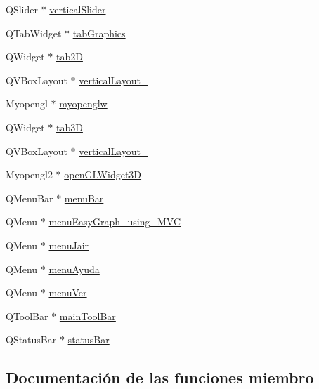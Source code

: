 \begin{DoxyCompactItemize}
\item 
Q\+Slider $\ast$ \hyperlink{class_ui___main_window_acc5d089772e8cdc8c53b20e42b7d80bc}{vertical\+Slider}
\item 
Q\+Tab\+Widget $\ast$ \hyperlink{class_ui___main_window_a1de3e72e2bc12e2eed6310aa029edb81}{tab\+Graphics}
\item 
Q\+Widget $\ast$ \hyperlink{class_ui___main_window_a899f4e2d7389496decf986fd28b33592}{tab2D}
\item 
Q\+V\+Box\+Layout $\ast$ \hyperlink{class_ui___main_window_a7b66d5d6ab55f3977317359d09a42345}{vertical\+Layout\+\_}
\item 
Myopengl $\ast$ \hyperlink{class_ui___main_window_a3d00510ae8482f745dd08b1dbea610ea}{myopenglw}
\item 
Q\+Widget $\ast$ \hyperlink{class_ui___main_window_a6fd265de04ef1e23e57f5bf03ed0af07}{tab3D}
\item 
Q\+V\+Box\+Layout $\ast$ \hyperlink{class_ui___main_window_aaa8cc393d5a44562d629a9f646d2c6dd}{vertical\+Layout\+\_}
\item 
Myopengl2 $\ast$ \hyperlink{class_ui___main_window_aaadd279932a15eab4a741ed917b8006b}{open\+G\+L\+Widget3D}
\item 
Q\+Menu\+Bar $\ast$ \hyperlink{class_ui___main_window_a2be1c24ec9adfca18e1dcc951931457f}{menu\+Bar}
\item 
Q\+Menu $\ast$ \hyperlink{class_ui___main_window_aeba4f6b68139c1d14ec1bc0402e19de6}{menu\+Easy\+Graph\+\_\+using\+\_\+\+M\+VC}
\item 
Q\+Menu $\ast$ \hyperlink{class_ui___main_window_afeada2d4fa7acbb4d7cedc3ac8989bc3}{menu\+Jair}
\item 
Q\+Menu $\ast$ \hyperlink{class_ui___main_window_a10219f124c2dbd88467bd6f049a056cc}{menu\+Ayuda}
\item 
Q\+Menu $\ast$ \hyperlink{class_ui___main_window_ac1b869bd0185526c8830ec2de49917b1}{menu\+Ver}
\item 
Q\+Tool\+Bar $\ast$ \hyperlink{class_ui___main_window_a5172877001c8c7b4e0f6de50421867d1}{main\+Tool\+Bar}
\item 
Q\+Status\+Bar $\ast$ \hyperlink{class_ui___main_window_a50fa481337604bcc8bf68de18ab16ecd}{status\+Bar}
\end{DoxyCompactItemize}


\subsection{Documentación de las funciones miembro}
